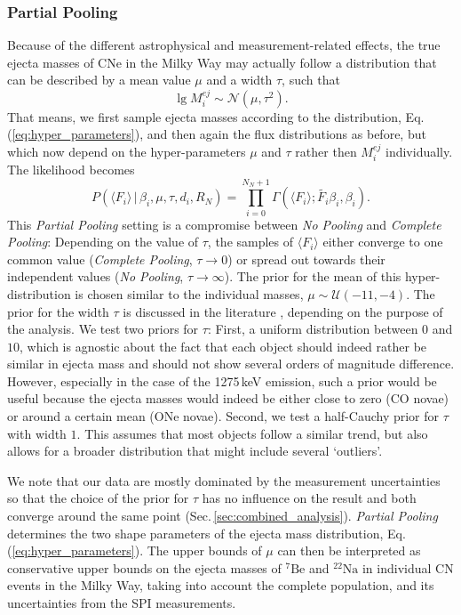 \documentclass{aa}
\newcommand{\mrm}[1]{\mathrm{#1}}
\newcommand{\nuc}[2]{$\mrm{^{#2}#1}$}
\begin{document}
\subsubsection{Partial Pooling}\label{sec:partial_pooling}
%
Because of the different astrophysical and measurement-related effects, the true ejecta masses of CNe in the Milky Way may actually follow a distribution that can be described by a mean value $\mu$ and a width $\tau$, such that
%
\begin{equation}
	\lg M_i^{ej} \sim \mathscr{N}(\mu,\tau^2)\mrm{.}
	\label{eq:hyper_parameters}
\end{equation}
%
That means, we first sample ejecta masses according to the distribution, Eq.\,(\ref{eq:hyper_parameters}), and then again the flux distributions as before, but which now depend on the hyper-parameters $\mu$ and $\tau$ rather then $M_{i}^{ej}$ individually.
%
The likelihood becomes
%
\begin{equation}
	P( \langle F_i \rangle\, | \,\beta_i, \mu, \tau, d_i, R_N) = \prod_{i=0}^{N_N+1} \Gamma(\langle F_i \rangle ; \tilde{F_i}\beta_i,\beta_i)\mrm{.}
	\label{eq:partial_pooling_sampling}
\end{equation}
%
This \textit{Partial Pooling} setting is a compromise between \textit{No Pooling} and \textit{Complete Pooling}:
%
Depending on the value of $\tau$, the samples of  $\langle F_i \rangle$ either converge to one common value (\textit{Complete Pooling}, $\tau \rightarrow 0$) or spread out towards their independent values (\textit{No Pooling}, $\tau \rightarrow \infty$).
%
The prior for the mean of this hyper-distribution is chosen similar to the individual masses, $\mu \sim \mathscr{U}(-11,-4)$.
%
The prior for the width $\tau$ is discussed in the literature \citep[][, and references therein]{Gelman2013_BDA3}, depending on the purpose of the analysis.
%
We test two priors for $\tau$:
%
First, a uniform distribution between $0$ and $10$, which is agnostic about the fact that each object should indeed rather be similar in ejecta mass and should not show several orders of magnitude difference.
%
However, especially in the case of the 1275\,keV emission, such a prior would be useful because the ejecta masses would indeed be either close to zero (CO novae) or around a certain mean (ONe novae).
%
Second, we test a half-Cauchy prior for $\tau$ with width $1$.
%
This assumes that most objects follow a similar trend, but also allows for a broader distribution that might include several `outliers'.

We note that our data are mostly dominated by the measurement uncertainties so that the choice of the prior for $\tau$ has no influence on the result and both converge around the same point (Sec.\,\ref{sec:combined_analysis}).
%
\textit{Partial Pooling} determines the two shape parameters of the ejecta mass distribution, Eq.\,(\ref{eq:hyper_parameters}).
%
The upper bounds of $\mu$ can then be interpreted as conservative upper bounds on the ejecta masses of \nuc{Be}{7} and \nuc{Na}{22} in individual CN events in the Milky Way, taking into account the complete population, and its uncertainties from the SPI measurements.
\end{document}
